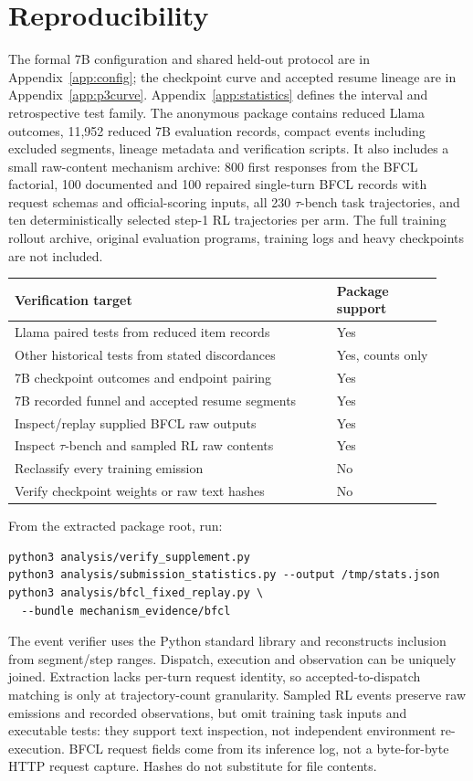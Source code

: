 \section{Reproducibility}
\label{app:repro}

The formal 7B configuration and shared held-out protocol are in Appendix~\ref{app:config};
the checkpoint curve and accepted resume lineage are in Appendix~\ref{app:p3curve}.
Appendix~\ref{app:statistics} defines the interval and retrospective test family.
The anonymous package contains reduced Llama outcomes, 11{,}952 reduced 7B evaluation
records, compact events including excluded segments, lineage metadata and verification
scripts. It also includes a small raw-content mechanism archive: 800 first responses from
the BFCL factorial, 100 documented and 100 repaired single-turn BFCL records with request
schemas and official-scoring inputs, all 230 $\tau$-bench task trajectories, and ten
deterministically selected step-1 RL trajectories per arm. The full training rollout archive,
original evaluation programs, training logs and heavy checkpoints are not included.

\begin{center}
\small
\begin{tabular}{@{}p{0.70\linewidth}p{0.23\linewidth}@{}}
\toprule
Verification target & Package support \\
\midrule
Llama paired tests from reduced item records & Yes \\
Other historical tests from stated discordances & Yes, counts only \\
7B checkpoint outcomes and endpoint pairing & Yes \\
7B recorded funnel and accepted resume segments & Yes \\
Inspect/replay supplied BFCL raw outputs & Yes \\
Inspect $\tau$-bench and sampled RL raw contents & Yes \\
Reclassify every training emission & No \\
Verify checkpoint weights or raw text hashes & No \\
\bottomrule
\end{tabular}
\end{center}

From the extracted package root, run:
\begin{verbatim}
python3 analysis/verify_supplement.py
python3 analysis/submission_statistics.py --output /tmp/stats.json
python3 analysis/bfcl_fixed_replay.py \
  --bundle mechanism_evidence/bfcl
\end{verbatim}
The event verifier uses the Python standard library and reconstructs inclusion from
segment/step ranges. Dispatch, execution and observation can be uniquely joined.
Extraction lacks per-turn request identity, so accepted-to-dispatch matching is only
at trajectory-count granularity. Sampled RL events preserve raw emissions and recorded
observations, but omit training task inputs and executable tests: they support text inspection,
not independent environment re-execution. BFCL request fields come from its inference log,
not a byte-for-byte HTTP request capture. Hashes do not substitute for file contents.

